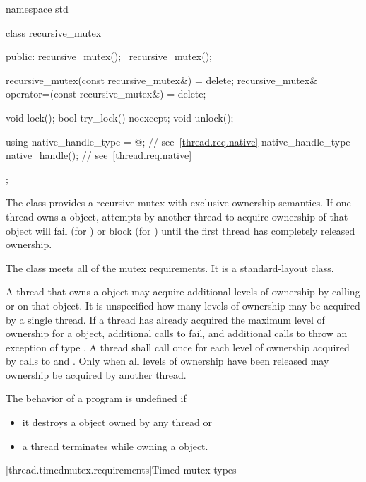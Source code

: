 %
\begin{codeblock}
namespace std {
  class recursive_mutex {
  public:
    recursive_mutex();
    ~recursive_mutex();

    recursive_mutex(const recursive_mutex&) = delete;
    recursive_mutex& operator=(const recursive_mutex&) = delete;

    void lock();
    bool try_lock() noexcept;
    void unlock();

    using native_handle_type = @\impdefnc@;          // see~\ref{thread.req.native}
    native_handle_type native_handle();                         // see~\ref{thread.req.native}
  };
}
\end{codeblock}

\pnum
{}%
The class  provides a recursive mutex with exclusive ownership
semantics. If one thread owns a  object, attempts by another
thread to acquire ownership of that object will fail (for ) or block
(for ) until the first thread has completely released ownership.

\pnum
The class  meets
all of the mutex requirements.
It is a standard-layout class.

\pnum
A thread that owns a  object may acquire additional levels of
ownership by calling  or  on that object. It is
unspecified how many levels of ownership may be acquired by a single thread. If a thread
has already acquired the maximum level of ownership for a 
object, additional calls to  fail, and additional calls to
 throw an exception of type . A thread
shall call  once for each level of ownership acquired by calls to
 and . Only when all levels of ownership have been
released may ownership be acquired by another thread.

\pnum
The behavior of a program is undefined if
\begin{itemize}
\item it destroys a  object owned by any thread or
\item a thread terminates while owning a  object.
\end{itemize}

[thread.timedmutex.requirements]{Timed mutex types}

